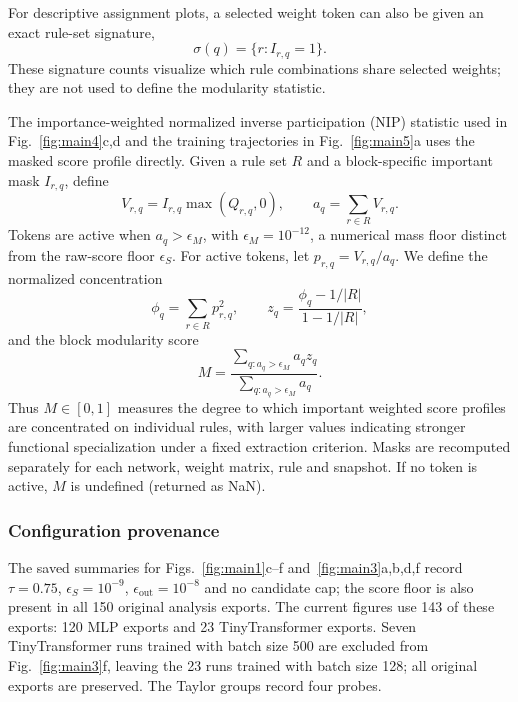 \documentclass{article}
\begin{document}
For descriptive assignment plots, a selected weight token can also be given an exact rule-set signature,
\begin{equation}
\sigma(q)=\{r:I_{r,q}=1\}.
\end{equation}
These signature counts visualize which rule combinations share selected weights; they are not used to define the modularity statistic.

The importance-weighted normalized inverse participation (NIP) statistic used in Fig.~\ref{fig:main4}c,d and the training trajectories in Fig.~\ref{fig:main5}a uses the masked score profile directly. Given a rule set $R$ and a block-specific important mask $I_{r,q}$, define
\begin{equation}
V_{r,q}=I_{r,q}\max(Q_{r,q},0),
\qquad a_q=\sum_{r\in R}V_{r,q}.
\end{equation}
Tokens are active when $a_q>\epsilon_M$, with $\epsilon_M=10^{-12}$, a numerical mass floor distinct from the raw-score floor $\epsilon_S$. For active tokens, let $p_{r,q}=V_{r,q}/a_q$. We define the normalized concentration
\begin{equation}
\phi_q=\sum_{r\in R}p_{r,q}^2,
\qquad
z_q=\frac{\phi_q-1/|R|}{1-1/|R|},
\end{equation}
and the block modularity score
\begin{equation}
M=\frac{\sum_{q:a_q>\epsilon_M}a_q z_q}{\sum_{q:a_q>\epsilon_M}a_q}.
\label{eq:modularity}
\end{equation}
Thus $M\in[0,1]$ measures the degree to which important weighted score profiles are concentrated on individual rules, with larger values indicating stronger functional specialization under a fixed extraction criterion. Masks are recomputed separately for each network, weight matrix, rule and snapshot. If no token is active, $M$ is undefined (returned as NaN).




\subsubsection{Configuration provenance}
The saved summaries for Figs.~\ref{fig:main1}c--f and~\ref{fig:main3}a,b,d,f record $\tau=0.75$, $\epsilon_S=10^{-9}$, $\epsilon_{\mathrm{out}}=10^{-8}$ and no candidate cap; the score floor is also present in all 150 original analysis exports. The current figures use 143 of these exports: 120 MLP exports and 23 TinyTransformer exports. Seven TinyTransformer runs trained with batch size 500 are excluded from Fig.~\ref{fig:main3}f, leaving the 23 runs trained with batch size 128; all original exports are preserved. The Taylor groups record four probes.
\end{document}
